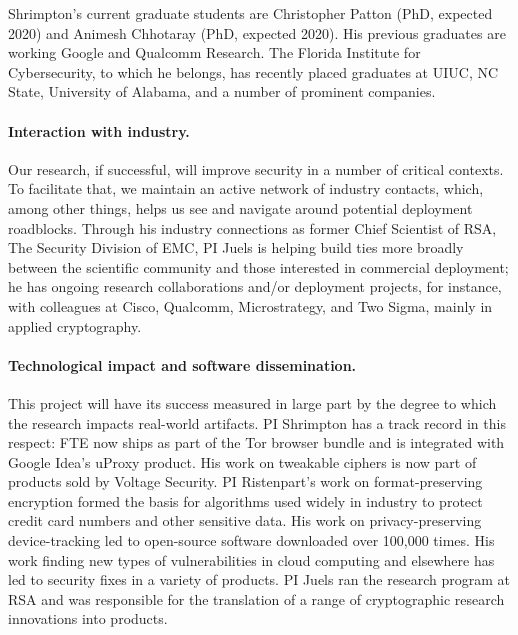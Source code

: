 Shrimpton's current graduate students are Christopher Patton (PhD,
expected 2020) and Animesh Chhotaray (PhD, expected 2020).  His
previous graduates are working Google and Qualcomm Research.  The Florida
Institute for Cybersecurity, to which he belongs, has recently placed
graduates at UIUC, NC State, University of Alabama, and a number of
prominent companies.




\paragraph{Interaction with industry.} Our research, if successful, will improve
security in a number of critical contexts. To facilitate that, we maintain an
active network of industry contacts, which, among other things, helps us see and
navigate around potential deployment roadblocks.
%
Through his industry connections as former Chief Scientist of RSA, The Security
Division of EMC, PI Juels is helping build ties more broadly between the
scientific community and those interested in commercial deployment; he has
ongoing research collaborations and/or deployment projects, for instance, with
colleagues at Cisco, Qualcomm, Microstrategy, and Two Sigma, mainly in applied
cryptography.

\paragraph{Technological impact and software dissemination.}
This project will have its success measured in large part by
the degree to which the research impacts real-world artifacts.  
PI Shrimpton has a track record in this respect: FTE now ships as
part of the Tor browser bundle and is integrated with Google Idea's
uProxy product. His work on tweakable ciphers is now part of
products sold by Voltage Security.
%
PI Ristenpart's work on format-preserving encryption formed the basis for
algorithms used widely in industry to protect credit card numbers and other
sensitive data. His work on privacy-preserving device-tracking led to
open-source software downloaded over 100,000 times.  His work finding new types
of vulnerabilities in cloud computing and elsewhere has led to security fixes in
a variety of products. PI Juels ran the research program at RSA and was
responsible for the translation of a range of cryptographic research innovations
into products.
%


